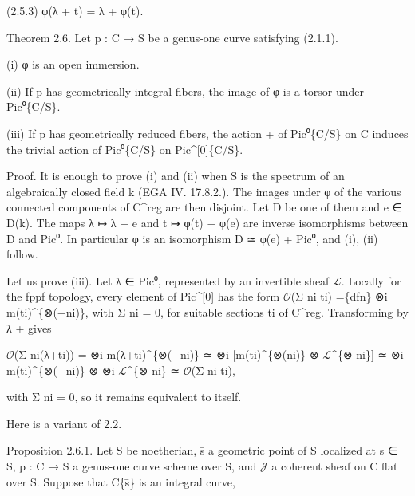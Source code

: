 \documentclass[11pt,a4paper]{article}
\begin{document}
(2.5.3)                 φ(λ + t) = λ + φ(t).

Theorem 2.6. Let p : C → S be a genus-one curve satisfying (2.1.1).

(i)     φ is an open immersion.

(ii)    If p has geometrically integral fibers, the image of φ is a torsor under Pic⁰\textunderscore{}\{C/S\}.

(iii)   If p has geometrically reduced fibers, the action + of Pic⁰\textunderscore{}\{C/S\} on C induces the trivial action of Pic⁰\textunderscore{}\{C/S\} on Pic\textasciicircum{}[0]\textunderscore{}\{C/S\}.

Proof. It is enough to prove (i) and (ii) when S is the spectrum of an algebraically closed field k (EGA IV. 17.8.2.). The images under φ of the various connected components of C\textasciicircum{}reg are then disjoint. Let D be one of them and e ∈ D(k). The maps λ ↦ λ + e and t ↦ φ(t) − φ(e) are inverse isomorphisms between D and Pic⁰. In particular φ is an isomorphism D ≃ φ(e) + Pic⁰, and (i), (ii) follow.

Let us prove (iii). Let λ ∈ Pic⁰, represented by an invertible sheaf \ensuremath{\mathcal{L}}. Locally for the fppf topology, every element of Pic\textasciicircum{}[0] has the form \ensuremath{\mathcal{O}}(Σ n\textunderscore{}i t\textunderscore{}i) =\textunderscore{}\{dfn\} ⊗\textunderscore{}i m(t\textunderscore{}i)\textasciicircum{}\{⊗(−n\textunderscore{}i)\}, with Σ n\textunderscore{}i = 0, for suitable sections t\textunderscore{}i of C\textasciicircum{}reg. Transforming by λ + gives

\ensuremath{\mathcal{O}}(Σ n\textunderscore{}i(λ+t\textunderscore{}i)) = ⊗\textunderscore{}i m(λ+t\textunderscore{}i)\textasciicircum{}\{⊗(−n\textunderscore{}i)\} ≃ ⊗\textunderscore{}i [m(t\textunderscore{}i)\textasciicircum{}\{⊗(n\textunderscore{}i)\} ⊗ \ensuremath{\mathcal{L}}\textasciicircum{}\{⊗ n\textunderscore{}i\}] ≃ ⊗\textunderscore{}i m(t\textunderscore{}i)\textasciicircum{}\{⊗(−n\textunderscore{}i)\} ⊗ ⊗\textunderscore{}i \ensuremath{\mathcal{L}}\textasciicircum{}\{⊗ n\textunderscore{}i\} ≃ \ensuremath{\mathcal{O}}(Σ n\textunderscore{}i t\textunderscore{}i),

with Σ n\textunderscore{}i = 0, so it remains equivalent to itself.

Here is a variant of 2.2.

Proposition 2.6.1. Let S be noetherian, s̄ a geometric point of S localized at s ∈ S, p : C → S a genus-one curve scheme over S, and \ensuremath{\mathcal{J}} a coherent sheaf on C flat over S. Suppose that C\textunderscore{}\{s̄\} is an integral curve,
\end{document}
